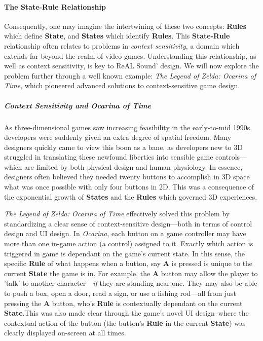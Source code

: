 \documentclass{report}
\newcommand{\rs}{ReAL Sound\xspace}
\newcommand{\state}[1]{\textbf{#1}}
\begin{document}
\paragraph{The State-Rule Relationship}

Consequently, one may imagine the intertwining of these two concepts: \state{Rules} which define \state{State}, and \state{States} which identify \state{Rules}. This \state{State-Rule} relationship often relates to problems in \emph{context sensitivity}, a domain which extends far beyond the realm of video games. Understanding this relationship, as well as context sensitivity, is key to \rs' design. We will now explore the problem further through a well known example: \emph{The Legend of Zelda: Ocarina of Time}, which pioneered advanced solutions to context-sensitive game design.

\subparagraph{Context Sensitivity and \emph{Ocarina of Time}}

As three-dimensional games saw increasing feasibility in the early-to-mid 1990s, developers were suddenly given an extra degree of spatial freedom. Many designers quickly came to view this boon as a bane, as developers new to 3D struggled in translating these newfound liberties into sensible game controls---which are limited by both physical design and human physiology. In essence, designers often believed they needed twenty buttons to accomplish in 3D space what was once possible with only four buttons in 2D. This was a consequence of the exponential growth of \state{States} and the \state{Rules} which governed 3D experiences. 

\emph{The Legend of Zelda: Ocarina of Time} effectively solved this problem by standardizing a clear sense of context-sensitive design---both in terms of control design and UI design. In \emph{Ocarina}, each button on a game controller may have more than one in-game action (a control) assigned to it. Exactly which action is triggered in game is dependant on the game's current state. In this sense, the specific \state{Rule} of what happens when a button, say \state{A} is pressed is unique to the current \state{State} the game is in. For example, the \state{A} button may allow the player to 'talk' to another character---\emph{if} they are standing near one. They may also be able to push a box, open a door, read a sign, or use a fishing rod---all from just pressing the \state{A} button, who's \state{Rule} is contextually dependant on the current \state{State}.This was also made clear through the game's novel UI design--where the contextual action of the button (the button's \state{Rule} in the current \state{State}) was clearly displayed on-screen at all times. 
\end{document}

